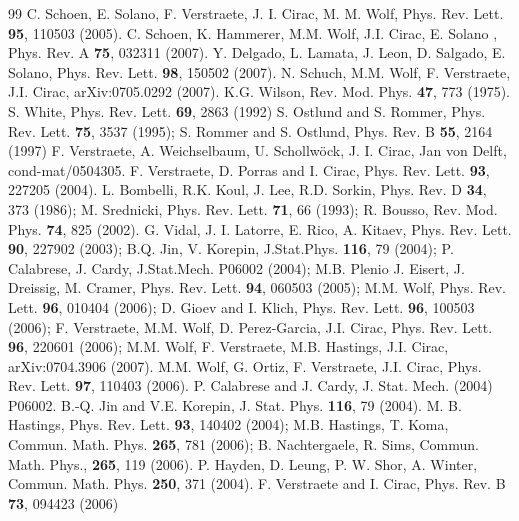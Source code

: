 \documentclass[aps,prl,epsfig,graphics,floatfix,mathbbm,a4paper]{article}
\newcommand{\1}{\mathbbm{1}}
\renewcommand{\>}{\rangle}
\newcommand{\<}{\langle}
\begin{document}
\begin{thebibliography}{99}
     C. Schoen, E. Solano, F. Verstraete, J. I. Cirac, M. M.
    Wolf, Phys. Rev. Lett. {\bf 95}, 110503 (2005).
     C. Schoen, K. Hammerer, M.M. Wolf, J.I. Cirac, E. Solano
    , Phys. Rev. A {\bf 75}, 032311 (2007).
     Y. Delgado, L. Lamata, J. Leon, D. Salgado, E.
    Solano, Phys. Rev. Lett. {\bf 98}, 150502 (2007).
      N. Schuch, M.M. Wolf, F. Verstraete, J.I. Cirac,
    arXiv:0705.0292 (2007).
     K.G. Wilson, Rev. Mod. Phys. {\bf 47}, 773 (1975).
     S. White, Phys. Rev. Lett. \textbf{69}, 2863 (1992)
     S. Ostlund and S. Rommer, Phys. Rev. Lett. \textbf{75}, 3537 (1995); S. Rommer and S. Ostlund, Phys. Rev. B \textbf{55}, 2164 (1997)
     F. Verstraete, A. Weichselbaum, U. Schollw\"{o}ck, J. I. Cirac, Jan von Delft, cond-mat/0504305.
     F. Verstraete, D. Porras and I. Cirac, Phys. Rev. Lett. \textbf{93}, 227205 (2004).
     L. Bombelli, R.K. Koul, J. Lee, R.D. Sorkin, Phys. Rev. D {\bf 34},
    373 (1986); M. Srednicki, Phys. Rev. Lett. {\bf 71}, 66 (1993); R.
    Bousso, Rev. Mod. Phys. {\bf 74}, 825 (2002).
     G. Vidal, J. I. Latorre, E. Rico, A. Kitaev, Phys. Rev. Lett. {\bf 90},
    227902 (2003); B.Q. Jin, V. Korepin, J.Stat.Phys. {\bf 116}, 79
    (2004); P. Calabrese, J. Cardy, J.Stat.Mech. P06002 (2004); M.B.
    Plenio  J. Eisert, J. Dreissig, M. Cramer, Phys. Rev. Lett. {\bf
            94}, 060503 (2005); M.M. Wolf, Phys. Rev. Lett. {\bf 96}, 010404
    (2006); D. Gioev and I. Klich, Phys. Rev. Lett. {\bf 96}, 100503
    (2006); F. Verstraete, M.M. Wolf, D. Perez-Garcia, J.I. Cirac,
    Phys. Rev. Lett. {\bf 96}, 220601 (2006); M.M. Wolf, F.
    Verstraete, M.B. Hastings, J.I. Cirac, arXiv:0704.3906 (2007).
     M.M. Wolf, G. Ortiz, F. Verstraete, J.I. Cirac, Phys. Rev. Lett. {\bf 97}, 110403 (2006).
     P. Calabrese and J. Cardy, J. Stat. Mech. (2004)
    P06002.
     B.-Q. Jin and  V.E. Korepin,  J. Stat. Phys. {\bf 116}, 79
    (2004).
     M. B. Hastings, Phys. Rev. Lett. {\bf 93}, 140402 (2004);
    M.B. Hastings, T. Koma, Commun. Math. Phys. {\bf 265}, 781 (2006);
    B. Nachtergaele, R. Sims, Commun. Math. Phys., {\bf 265}, 119
    (2006).
     P. Hayden, D. Leung, P. W. Shor, A. Winter, Commun. Math.
    Phys. {\bf 250}, 371 (2004).
     F. Verstraete and I. Cirac, Phys. Rev. B
    \textbf{73}, 094423 (2006)

\end{thebibliography}
\end{document}
